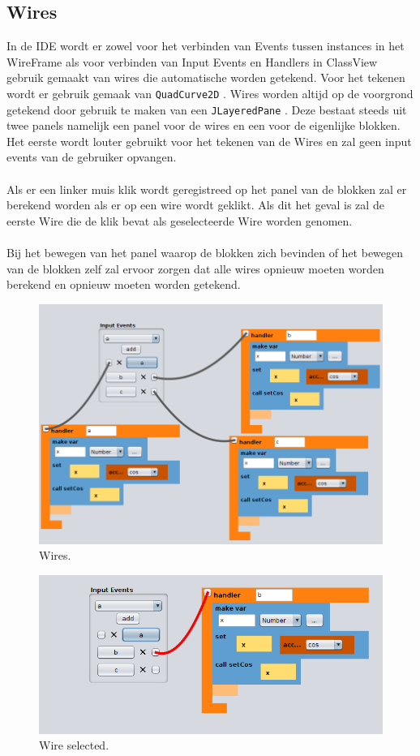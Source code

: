 \documentclass[]{article}
\begin{document}
\subsection{Wires}
In de IDE wordt er zowel voor het verbinden van Events tussen instances in het WireFrame als voor verbinden van Input Events en Handlers in ClassView gebruik gemaakt van wires die automatische worden getekend. Voor het tekenen wordt er gebruik gemaak van \texttt{QuadCurve2D} \cite{QuadCurve}. Wires worden altijd op de voorgrond getekend door gebruik te maken van een \texttt{JLayeredPane} \cite{LayedPane}. Deze bestaat steeds uit twee panels namelijk een panel voor de wires en een voor de eigenlijke blokken. Het eerste wordt louter gebruikt voor het tekenen van de Wires en zal geen input events van de gebruiker opvangen.\\\\
Als er een linker muis klik wordt geregistreed op het panel van de blokken zal er berekend worden als er op een wire wordt geklikt. Als dit het geval is zal de eerste Wire die de klik bevat als geselecteerde Wire worden genomen.\\\\
Bij het bewegen van het panel waarop de blokken zich bevinden of het bewegen van de blokken zelf zal ervoor zorgen dat alle wires opnieuw moeten worden berekend en opnieuw moeten worden getekend.

\begin{figure}[H]
  \centering
\includegraphics[scale=0.4]{AnalyseADTAlgorithm/wires.png}
  \caption{Wires.} \label{wires}
\end{figure}
\begin{figure}[H]
  \centering
\includegraphics[scale=0.5]{AnalyseADTAlgorithm/wireSelected.png}
  \caption{Wire selected.} \label{wireSelected}
\end{figure}
\end{document}
